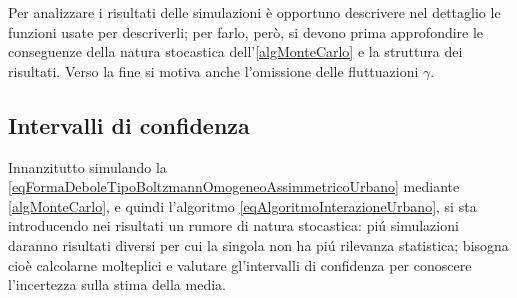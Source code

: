     Per analizzare i risultati delle simulazioni è opportuno descrivere nel dettaglio le funzioni usate per descriverli; per farlo, però, si devono prima approfondire le conseguenze della natura stocastica dell'\cref{algMonteCarlo} e la struttura dei risultati. Verso la fine si motiva anche l'omissione delle fluttuazioni \(\gamma\).
    
    \subsection{Intervalli di confidenza}

      Innanzitutto simulando la \ref{eqFormaDeboleTipoBoltzmannOmogeneoAssimmetricoUrbano} mediante \cref{algMonteCarlo}, e quindi l'algoritmo \ref{eqAlgoritmoInterazioneUrbano}, si sta introducendo nei risultati un rumore di natura stocastica: piú simulazioni daranno risultati diversi per cui la singola non ha piú rilevanza statistica; bisogna cioè calcolarne molteplici e valutare gl'intervalli di confidenza per conoscere l'incertezza sulla stima della media.

